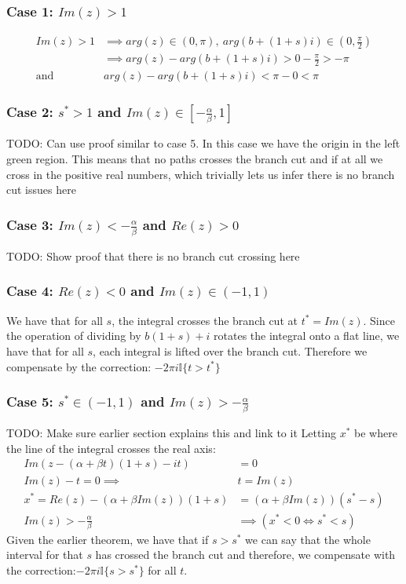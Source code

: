 \documentclass{article}
\begin{document}
\subsubsection{Case 1: $Im(z)>1$}
\begin{align}
    Im(z)>1 &\implies arg(z) \in (0,\pi), \: arg(b+(1+s)i) \in (0,\frac{\pi}{2})\\
    &\implies arg(z)-arg(b+(1+s)i) > 0-\frac{\pi}{2} > -\pi\\
    \text{and }& arg(z)-arg(b+(1+s)i)<\pi-0<\pi
\end{align}

\subsubsection{Case 2: $s^*>1$ and $Im(z)\in[-\frac{\alpha}{\beta},1]$}
TODO: Can use proof similar to case 5.
In this case we have the origin in the left green region.
This means that no paths crosses the branch cut and if at all we cross in the positive real numbers, which trivially lets us infer there is no branch cut issues here

\subsubsection{Case 3: $Im(z)<-\frac{\alpha}{\beta}$ and $Re(z)>0$}
TODO: Show proof that there is no branch cut crossing here

\subsubsection{Case 4: $Re(z)<0$ and $Im(z)\in(-1,1)$}
We have that for all $s$, the integral crosses the branch cut at $t^*=Im(z)$.
Since the operation of dividing by $b(1+s)+i$ rotates the integral onto a flat line, we have that for all $s$, each integral is lifted over the branch cut.
Therefore we compensate by the correction: $-2\pi i\mathbb{I}\{t>t^*\}$

\subsubsection{Case 5: $s^*\in(-1,1)$ and $Im(z)>-\frac{\alpha}{\beta}$}
TODO: Make sure earlier section explains this and link to it
Letting $x^*$ be where the line of the integral crosses the real axis:
\begin{align}
    Im(z-(\alpha+\beta t)(1+s)-it)&=0\\
    Im(z)-t=0\implies &t=Im(z)\\
    x^*=Re(z)-(\alpha+\beta Im(z))(1+s)&=(\alpha+\beta Im(z))(s^*-s)\\
    Im(z)>-\frac{\alpha}{\beta}&\implies (x^*<0 \iff s^*<s)
\end{align}
Given the earlier theorem, we have that if $s>s^*$ we can say that the whole interval for that $s$ has crossed the branch cut and therefore, we compensate with the correction:$-2\pi i\mathbb{I}\{s>s^*\}$ for all $t$.
\end{document}
